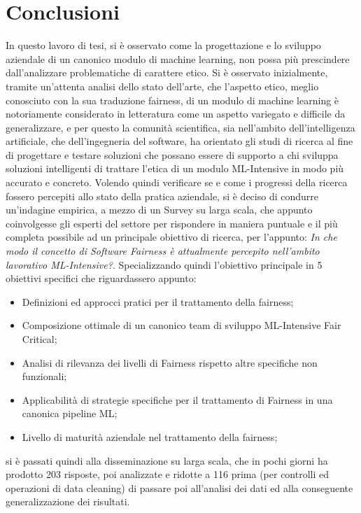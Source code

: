 \chapter{Conclusioni} %
%


	In questo lavoro di tesi, si è osservato come la progettazione e lo sviluppo aziendale di un canonico modulo di machine learning, non possa più prescindere dall'analizzare problematiche di carattere etico. Si è osservato inizialmente, tramite un'attenta analisi dello stato dell'arte, che l'aspetto etico, meglio conosciuto con la sua traduzione fairness, di un modulo di machine learning  è notoriamente considerato in letteratura come un aspetto variegato e difficile da generalizzare, e per questo la comunità scientifica, sia nell'ambito dell'intelligenza artificiale, che dell'ingegneria del software, ha orientato gli studi di ricerca al fine di progettare e testare soluzioni che possano essere di supporto a chi sviluppa soluzioni intelligenti di trattare l'etica di un modulo ML-Intensive in modo più accurato e concreto. Volendo quindi verificare se e come i progressi della ricerca fossero percepiti allo stato della pratica aziendale, si è deciso di condurre un'indagine empirica, a mezzo di un Survey su larga scala, che appunto coinvolgesse gli esperti del settore per rispondere in maniera puntuale e il più completa possibile ad un principale obiettivo di ricerca, per l'appunto: \emph{In che modo il concetto di Software Fairness è attualmente percepito nell'ambito lavorativo ML-Intensive?}. Specializzando quindi l'obiettivo principale in 5 obiettivi specifici che riguardassero appunto:
	\begin{itemize}
	    \item Definizioni ed approcci pratici per il trattamento della fairness;
	    \item Composizione ottimale di un canonico team di sviluppo ML-Intensive Fair Critical;
	    \item Analisi di rilevanza dei livelli di Fairness rispetto altre specifiche non funzionali;
	    \item Applicabilità di strategie specifiche per il trattamento di Fairness in una canonica pipeline ML;
	    \item Livello di maturità aziendale nel trattamento della fairness;
	\end{itemize}

    si è passati quindi alla disseminazione su larga scala, che in pochi giorni ha prodotto 203 risposte, poi analizzate e ridotte a 116 prima (per controlli ed operazioni di data cleaning) di passare poi all'analisi dei dati ed alla conseguente generalizzazione dei risultati.\\\\
    
